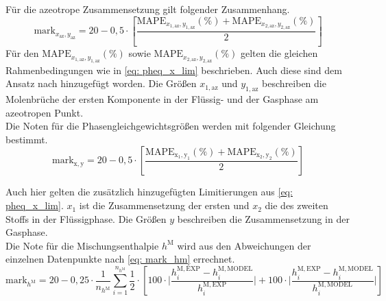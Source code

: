 \documentclass[../thesis.tex]{subfiles}
\begin{document}
Für die azeotrope Zusammensetzung gilt folgender Zusammenhang.
\begin{equation}
\mathrm{mark}_{x_\mathrm{az},y_\mathrm{az}} = 20 - 0,5 \cdot \left[
	\dfrac{\mathrm{MAPE}_{x_{1,\mathrm{az}},y_{1,\mathrm{az}}}(\%) + \mathrm{MAPE}_{x_{2,\mathrm{az}},y_{2,\mathrm{az}}}(\%)}{2}
\right]
\end{equation}
Für den $ \mathrm{MAPE}_{x_{1,\mathrm{az}},y_{1,\mathrm{az}}}(\%) $ sowie $ \mathrm{MAPE}_{x_{2,\mathrm{az}},y_{2,\mathrm{az}}}(\%) $ gelten die gleichen Rahmenbedingungen wie in \autoref{eq: pheq_x_lim} beschrieben. Auch diese sind dem Ansatz nach \cite{jaubert2020benchmark} hinzugefügt worden. Die Größen $ x_{1,\mathrm{az}} $ und $ y_{1,\mathrm{az}} $ beschreiben die Molenbrüche der ersten Komponente in der Flüssig- und der Gasphase am azeotropen Punkt. 
\\

Die Noten für die Phasengleichgewichtsgrößen werden mit folgender Gleichung bestimmt.
\begin{equation}
	\mathrm{mark}_{\mathrm{x,y}} = 20 - 0,5 \cdot \left[
		\dfrac{\mathrm{MAPE_{x_1,y_1}(\%)} + \mathrm{MAPE_{x_2,y_2}}(\%)}{2}
	\right]
\end{equation}

Auch hier gelten die zusätzlich hinzugefügten Limitierungen aus \autoref{eq: pheq_x_lim}.
$x_1$ ist die Zusammensetzung der ersten und $x_2$ die des zweiten Stoffs in der Flüssigphase. Die Größen $ y $ beschreiben die Zusammensetzung in der Gasphase.
\\

Die Note für die Mischungsenthalpie $ h^{\mathrm{M}} $ wird aus den Abweichungen der einzelnen Datenpunkte nach \autoref{eq: mark_hm} errechnet.
\begin{equation}
\mathrm{mark}_{h^{\mathrm{M}}} = 20 - 0,25 \cdot \dfrac{1}{n_{h^{\mathrm{M}}}} \sum_{i=1}^{n_{h^{\mathrm{M}}}}
	\dfrac{1}{2} \cdot \left[
		100 \cdot \biggl|
			\dfrac{h_i^{\mathrm{M,EXP}}-h_i^{\mathrm{M,MODEL}}}{h_i^{\mathrm{M,EXP}}} 
			\biggl| 
			+ 100 \cdot \biggl| \dfrac{h_i^{\mathrm{M,EXP}}-h_i^{\mathrm{M,MODEL}}}{h_i^{\mathrm{M,MODEL}}}
		\biggl|
	\right]
\label{eq: mark_hm}
\end{equation}
\end{document}
